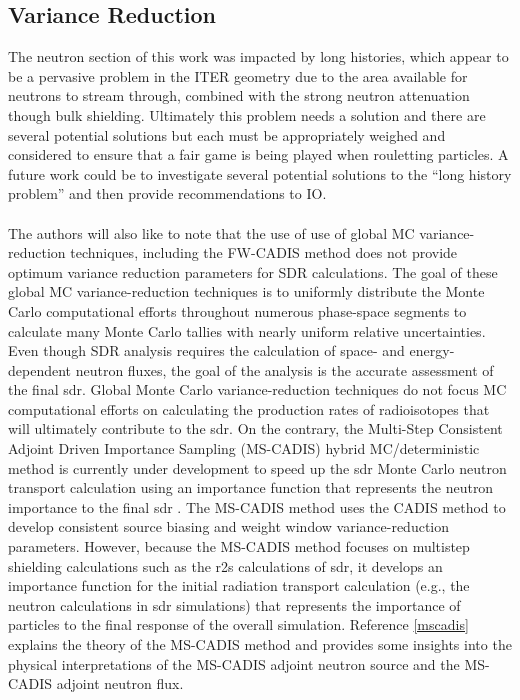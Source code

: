 \documentclass[12pt]{article}
\begin{document}
\subsection*{Variance Reduction}
The neutron section of this work was impacted by long histories, which appear to
be a pervasive problem in the ITER geometry due to the area available for
neutrons to stream through, combined with the strong neutron attenuation though
bulk shielding. Ultimately this problem needs a solution and there are several
potential solutions but each must be appropriately weighed and considered to
ensure that a fair game is being played when rouletting particles. A future
work could be to investigate several potential solutions to the ``long history
problem'' and then provide recommendations to IO.
\\
\\
The authors will also like to note that the use of use of global MC 
variance-reduction techniques, including the FW-CADIS method does not 
provide optimum variance reduction parameters for SDR calculations. 
The goal of these global MC variance-reduction techniques is to uniformly 
distribute the Monte Carlo computational efforts throughout numerous 
phase-space segments to calculate many Monte Carlo tallies with nearly 
uniform relative uncertainties. Even though SDR analysis requires the 
calculation of space- and energy-dependent neutron fluxes, the goal of 
the analysis is the accurate assessment of the final \gls{sdr}. Global 
Monte Carlo variance-reduction techniques do not focus MC computational 
efforts on calculating the production rates of radioisotopes that will 
ultimately contribute to the \gls{sdr}. On the contrary, the Multi-Step 
Consistent Adjoint Driven Importance Sampling (MS-CADIS) hybrid 
MC/deterministic method is currently under development to speed up the \gls{sdr}
 Monte Carlo neutron transport calculation using an importance function that 
represents the neutron importance to the final \gls{sdr} \cite{mscadis}. 
The MS-CADIS method uses the CADIS method to develop consistent source biasing 
and weight window variance-reduction parameters. However, because the MS-CADIS 
method focuses on multistep shielding calculations such as the \gls{r2s} 
calculations of \gls{sdr}, it develops an importance function for the initial 
radiation transport calculation (e.g., the neutron calculations in \gls{sdr} 
simulations) that represents the importance of particles to the final response
 of the overall simulation. Reference \ref{mscadis} explains the theory of the MS-CADIS 
method and provides some insights into the physical interpretations of the 
MS-CADIS adjoint neutron source and the MS-CADIS adjoint neutron flux.
\end{document}
